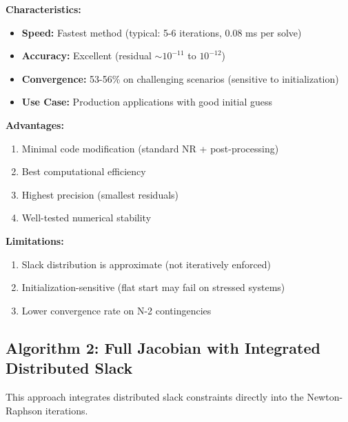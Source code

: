\documentclass[11pt]{article}
\begin{document}
\textbf{Characteristics:}
\begin{itemize}
    \item \textbf{Speed:} Fastest method (typical: 5-6 iterations, 0.08 ms per solve)
    \item \textbf{Accuracy:} Excellent (residual $\sim 10^{-11}$ to $10^{-12}$)
    \item \textbf{Convergence:} 53-56\% on challenging scenarios (sensitive to initialization)
    \item \textbf{Use Case:} Production applications with good initial guess
\end{itemize}

\textbf{Advantages:}
\begin{enumerate}
    \item Minimal code modification (standard NR + post-processing)
    \item Best computational efficiency
    \item Highest precision (smallest residuals)
    \item Well-tested numerical stability
\end{enumerate}

\textbf{Limitations:}
\begin{enumerate}
    \item Slack distribution is approximate (not iteratively enforced)
    \item Initialization-sensitive (flat start may fail on stressed systems)
    \item Lower convergence rate on N-2 contingencies
\end{enumerate}

\subsection{Algorithm 2: Full Jacobian with Integrated Distributed Slack}

This approach integrates distributed slack constraints directly into the Newton-Raphson iterations.
\end{document}
